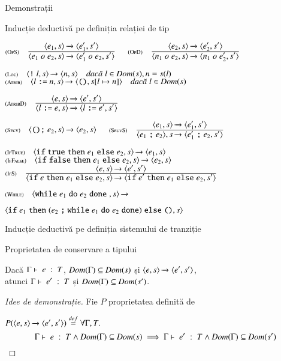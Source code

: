 \documentclass[xcolor=pdftex,romanian,colorlinks]{beamer}
\begin{document}
\begin{section}{Demonstrații}
\begin{subsection}{Inducție deductivă pe definiția relației de tip}
\begin{frame}
\vfill { $\reg[OpS]{\Ss{\c{e_1 \mathrel{o} e_2,\stare}}{\c{e_1' \mathrel{o} e_2,\stare'}}}{\Ss{\c{e_1,\stare}}{\c{e_1',\stare'}}}{}$\hfill
$\reg[OpD]{\Ss{\c{n_1 \mathrel{o} e_2,\stare}}{\c{n_1 \mathrel{o} e_2',\stare'}}}{\Ss{\c{e_2,\stare}}{\c{e_2',\stare'}}}{}$}

\vfill $\reg[Loc]{\Ss{\c{\terminal{!} l,\stare}}{\c{n, \stare}}}{}{l\in\Dom(\stare), n = \stare(l)}$
$\reg[Atrib]{\Ss{\c{l \terminal{:=} n,\stare}}{\c{\Sskip,\stare[l \mapsto n]}}}{}{l\in\Dom(\stare)}$

\vfill$\reg[AtribD]{\Ss{\c{l \terminal{:=} e ,\stare}}{\c{l \terminal{:=} e' ,\stare'}}}{\Ss{\c{e,\stare}}{\c{e',\stare'}}}{}$

$\reg[Secv]{\Ss{\c{\Sskip \terminal{;} e_2,\stare}}{\c{e_2,\stare}}}{}{}$
$\reg[SecvS]{\Ss{\c{e_1 \terminal{;} e_2},\stare}{\c{e_1' \terminal{;} e_2,\stare'}}}{\Ss{\c{e_1,\stare}}{\c{e_1',\stare'}}}{}$


\vfill $\reg[IfTrue]{\Ss{\c{\Sif  {\terminal{true}} \Sthen e_1 \Selse e_2,\stare}}{\c{e_1,\stare}}}{}{}$ 
$\reg[IfFalse]{\Ss{\c{\Sif {\terminal{false}} \Sthen e_1 \Selse e_2,\stare}}{\c{e_2,\stare}}}{}{}$ 
$\reg[IfS]{
 \Ss{\c{\Sif {e} \Sthen e_1 \Selse e_2,\stare}}{\c{\Sif  {e'} \Sthen e_1 \Selse e_2,\stare'}}
}{
  \Ss{\c{e,\stare}}{\c{e',\stare'}}
}
{}$

\vfill $\reg[While]{\Ss{\c{\Swhile {e_1} \Sdo e_2 \Sdone{},\stare}}{}}{}
{}$

\hfill ${\langle{\ensuremath\mathrel{\text{\ttfamily if}}{e_1} \ensuremath\mathrel{\text{\ttfamily then}}(e_2\ensuremath\mathrel{\text{\ttfamily ;}} {\ensuremath\mathrel{\text{\ttfamily while}}{e_1} \ensuremath\mathrel{\text{\ttfamily do}}e_2 \ensuremath\mathrel{\text{\ttfamily done}}}) \ensuremath\mathrel{\text{\ttfamily else}}{\ensuremath\mathrel{\text{\ttfamily ()}}},s}\rangle}$

\end{frame}

\end{subsection}

\begin{subsection}{Inducție deductivă pe definiția sistemului de tranziție}

\begin{frame}{Proprietatea de conservare a tipului}

\begin{theorem}
Dacă ${\displaystyle \Gamma\vdash \; e \; : \; T}$, $\mathop{\it Dom}(\Gamma) \subseteq \mathop{\it Dom}(s)$ și $\displaystyle{\ensuremath {{\langle{e,s}\rangle}} \xrightarrow{} {{\ensuremath \langle{e',s'}\rangle}}}$, \\atunci 
${\displaystyle \Gamma\vdash \; e' \; : \; T}$ și $\mathop{\it Dom}(\Gamma) \subseteq \mathop{\it Dom}(s')$.
\end{theorem}

\begin{proof}[Idee de demonstrație]
 Fie $P$ proprietatea definită de 

\(P(\displaystyle{\ensuremath {{\langle{e,s}\rangle}} \xrightarrow{} {{\ensuremath \langle{e',s'}\rangle}}}) \stackrel{def}{=} \forall \Gamma,T.\)
\[{\displaystyle \Gamma\vdash \; e \; : \; T} \wedge \mathop{\it Dom}(\Gamma)\subseteq\mathop{\it Dom}(s) \implies {\displaystyle \Gamma\vdash \; e' \; : \; T} \wedge \mathop{\it Dom}(\Gamma)\subseteq\mathop{\it Dom}(s') 
\]


\end{proof}
\end{frame}
\end{subsection}
\end{section}
\end{document}
